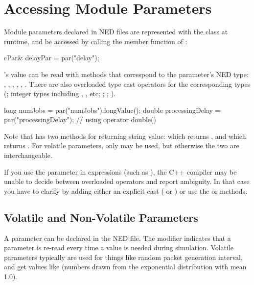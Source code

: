 \section{Accessing Module Parameters}
\label{sec:simple-modules:parameters}

Module parameters declared in NED files are represented with the 
class at runtime, and be accessed
by calling the  member function of :

\begin{cpp}
cPar& delayPar = par("delay");
\end{cpp}

's value can be read with methods that correspond to
the parameter's NED type: , ,
, , ,
.
There are also overloaded type cast operators for the corresponding types
(; integer types including , , etc;
; ; ).

\begin{cpp}
long numJobs = par("numJobs").longValue();
double processingDelay = par("processingDelay"); // using operator double()
\end{cpp}

Note that  has two methods for returning string value:
 which returns , and
 which returns .
For volatile parameters, only  may be used,
but otherwise the two are interchangeable.

If you use the  parameter in expressions (such as
), the C++ compiler may be unable to decide
between overloaded operators and report ambiguity. In that case
you have to clarify by adding either an explicit cast
( or ) or use
the  or  methods.


\subsection{Volatile and Non-Volatile Parameters}
\label{sec:simple-modules:volatile-parameters}

A parameter can be declared  in the NED file. The 
modifier indicates that a parameter is re-read every time a value is needed
during simulation. Volatile parameters typically are used for things like
random packet generation interval, and get values like 
(numbers drawn from the exponential distribution with mean 1.0).

